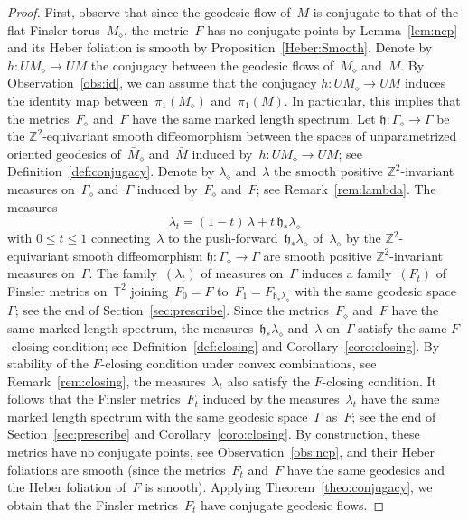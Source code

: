 \documentclass[AHL,Unicode,longabstracts,published]{cedram}
\newcommand{\Z}{\mathbb{Z}}
\newcommand{\T}{\mathbb{T}}
\newcommand{\bh}{\mathfrak{h}}
\begin{document}
\begin{proof}
First, observe that since the geodesic flow of~$M$ is conjugate to that of the flat Finsler torus~$M_\diamond$, the metric~$F$ has no conjugate points by Lemma~\ref{lem:ncp} and its Heber foliation is smooth by Proposition~\ref{Heber:Smooth}. Denote by \mbox{$h:UM_\diamond \to UM$} the conjugacy between the geodesic flows of~$M_\diamond$ and~$M$. By Observation~\ref{obs:id}, we can assume that the conjugacy $h:UM_\diamond \to UM$ induces the identity map between~$\pi_1(M_\diamond)$ and~$\pi_1(M)$. In particular, this implies that the metrics~$F_\diamond$ and~$F$ have the same marked length spectrum. Let $\bh:\Gamma_\diamond \to \Gamma$ be the $\Z^2$-equivariant smooth diffeomorphism between the spaces of unparametrized oriented geodesics of~$\bar{M}_\diamond$ and~$\bar{M}$ induced by~$h:UM_\diamond \to UM$; see Definition~\ref{def:conjugacy}. Denote by $\lambda_\diamond$ and~$\lambda$ the smooth positive $\Z^2$-invariant measures on~$\Gamma_\diamond$ and~$\Gamma$ induced by~$F_\diamond$ and~$F$; see Remark~\ref{rem:lambda}. The measures
\[
\lambda_t = (1-t) \, \lambda + t \, \bh_*\lambda_\diamond
\]
with $0 \leq t \leq 1$ connecting~$\lambda$ to the push-forward~$\bh_* \lambda_\diamond$ of~$\lambda_\diamond$ by the $\Z^2$-equivariant smooth diffeomorphism $\bh:\Gamma_\diamond \to \Gamma$ are smooth positive $\Z^2$-invariant measures on~$\Gamma$. The family~$(\lambda_t)$ of measures on~$\Gamma$ induces a family~$(F_t)$ of Finsler metrics on~$\T^2$ joining~$F_0=F$ to~$F_1=F_{\bh_* \lambda_\diamond}$ with the same geodesic space~$\Gamma$; see the end of Section~\ref{sec:prescribe}. Since the metrics~$F_\diamond$ and~$F$ have the same marked length spectrum, the measures~$\bh_* \lambda_\diamond$ and~$\lambda$ on~$\Gamma$ satisfy the same $F$-closing condition; see Definition~\ref{def:closing} and Corollary~\ref{coro:closing}. By stability of the $F$-closing condition under convex combinations, see Remark~\ref{rem:closing}, the measures~$\lambda_t$ also satisfy the $F$-closing condition. It follows that the Finsler metrics~$F_t$ induced by the measures~$\lambda_t$ have the same marked length spectrum with the same geodesic space~$\Gamma$ as~$F$; see the end of Section~\ref{sec:prescribe} and Corollary~\ref{coro:closing}. By construction, these metrics have no conjugate points, see Observation~\ref{obs:ncp}, and their Heber foliations are smooth (since the metrics~$F_t$ and~$F$ have the same geodesics and the Heber foliation of~$F$ is smooth). Applying Theorem~\ref{theo:conjugacy}, we obtain that the Finsler metrics~$F_t$ have conjugate geodesic flows. 


\end{proof}
\end{document}
